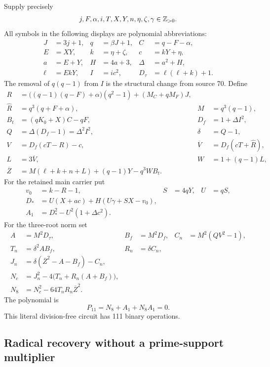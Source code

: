 Supply precisely
\[
 j,F,\alpha,i,T,X,Y,n,\eta,\zeta,\gamma\in\mathbb Z_{>0}.
\]
All symbols in the following displays are polynomial abbreviations:
\begin{align*}
 J&=3j+1,&q&=\beta J+1,&C&=q-F-\alpha,\\
 E&=XY,&k&=\eta+\zeta,&c&=kY+\eta,\\
 a&=E+Y,&H&=4a+3,&\Delta&=a^2+H,\\
 \ell&=EkY,&I&=ic^2,&D_\tau&=\ell(\ell+k)+1.
\end{align*}
The removal of $q(q-1)$ from $I$ is the structural change from source 70.
Define
\begin{align*}
 R&=\bigl((q-1)(q-F)+\alpha\bigr)(q^2-1)+(M_C+qM_F)J,\\
 \widehat R&=q^3(q+F+\alpha),& M&=q^3(q-1),\\
 B_t&=(qK_0+X)C-qF,&D_f&=1+\Delta I^2,\\
 Q&=\Delta(D_f-1)=\Delta^2I^2,&\delta&=Q-1,\\
 V&=D_f(cT-R)-c,&\overline V&=D_f(cT+\widehat R),\\
 L&=3\overline V,&W&=1+(q-1)L,\\
 \overline Z&=M(\ell+k+n+L)+(q-1)Y-q^3WB_t.
\end{align*}
For the retained main carrier put
\begin{align*}
 v_0&=k-R-1,& S&=4qY,&U&=qS,\\
 D_*&=U(X+ac)+H(U\gamma+SX-v_0),\\
 A_1&=D_*^2-U^2(1+\Delta c^2).
\end{align*}
For the three-root norm set
\begin{align*}
 A&=M^2D_\tau,&B_f&=M^2D_f,&C_n&=M^2(QV^2-1),\\
 T_n&=\delta^2AB_f,&R_n&=\delta C_n,\\
 J_n&=\delta(\overline Z^2-A-B_f)-C_n,\\
 N_c&=J_n^2-4\bigl(T_n+R_n(A+B_f)\bigr),\\
 N_8&=N_c^2-64T_nR_n\overline Z^2.
\end{align*}
The polynomial is
\begin{equation}
 \boxed{P_{11}=N_8+A_1+N_8A_1=0.}
 \label{eq:P11}
\end{equation}
This literal division-free circuit has 111 binary operations.

\subsection{Radical recovery without a prime-support multiplier}

